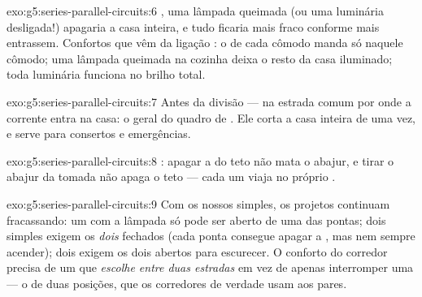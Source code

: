\begin{solution}{exo:g5:series-parallel-circuits:6}
, uma lâmpada queimada (ou uma luminária desligada!) apagaria
a casa inteira, e tudo ficaria mais fraco conforme mais 
entrassem. Confortos que vêm da ligação : o  de
cada cômodo manda só naquele cômodo; uma lâmpada queimada na cozinha
deixa o resto da casa iluminado; toda luminária funciona no brilho
total.
\end{solution}

\begin{solution}{exo:g5:series-parallel-circuits:7}
Antes da divisão --- na estrada comum por onde a corrente entra na
casa: o  geral do quadro de . Ele corta a casa
inteira de uma vez, e serve para consertos e emergências.
\end{solution}

\begin{solution}{exo:g5:series-parallel-circuits:8}
: apagar a  do teto não mata o abajur, e tirar o abajur
da tomada não apaga o teto --- cada um viaja no próprio .
\end{solution}

\begin{solution}{exo:g5:series-parallel-circuits:9}
Com os nossos  simples, os projetos continuam
fracassando: um   com a lâmpada só pode ser aberto
de uma das pontas; dois  simples  exigem os
\emph{dois} fechados (cada ponta consegue apagar a , mas nem
sempre acender); dois  exigem os dois abertos para
escurecer. O conforto do corredor precisa de um  que
\emph{escolhe entre duas estradas} em vez de apenas interromper uma
--- o  de duas posições, que os corredores de verdade usam
aos pares.
\end{solution}

